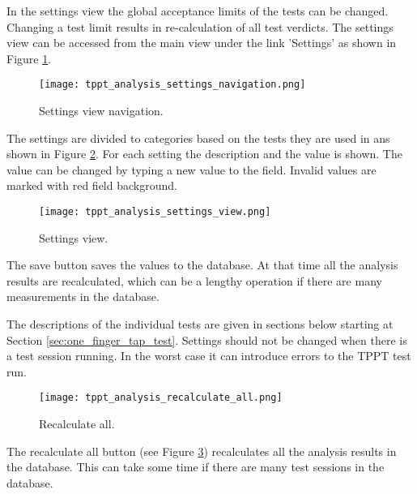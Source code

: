 In the settings view the global acceptance limits of the tests can be changed. Changing a test limit results in re-calculation of all test verdicts. 
The settings view can be accessed from the main view under the link 'Settings' as shown in Figure \ref{fig:tppt_analysis_settings_navigation}.

\begin{figure}[!h]
	\centering
	\texttt{[image: tppt\_analysis\_settings\_navigation.png]}
	\caption{Settings view navigation.}
	\label{fig:tppt_analysis_settings_navigation}
\end{figure}

The settings are divided to categories based on the tests they are used in ans shown in Figure \ref{fig:tppt_analysis_settings_view}. For each setting the description and the value is shown. The value can be changed by typing a new value to the field. Invalid values are marked with red field background.

\begin{figure}[!h]
	\centering
	\texttt{[image: tppt\_analysis\_settings\_view.png]}
	\caption{Settings view.}
	\label{fig:tppt_analysis_settings_view}
\end{figure}

The save button saves the values to the database. At that time all the analysis results are recalculated, which can be a lengthy operation if there are many measurements in the database.

The descriptions of the individual tests are given in sections below starting at Section \ref{sec:one_finger_tap_test}.
Settings should not be changed when there is a test session running. In the worst case it can introduce errors to the TPPT test run.

\begin{figure}[!h]
	\centering
	\texttt{[image: tppt\_analysis\_recalculate\_all.png]}
	\caption{Recalculate all.}
	\label{fig:tppt_analysis_recalculate_all}
\end{figure}

The recalculate all button (see Figure \ref{fig:tppt_analysis_recalculate_all}) recalculates all the analysis results in the database. This can take some time if there are many test sessions in the database.


